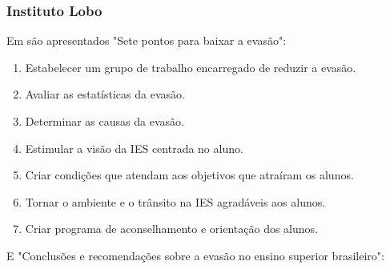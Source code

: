 \documentclass{report}
\begin{document}
\subsubsection{Instituto Lobo}

Em \cite{evasao_panorama2} são apresentados "Sete pontos para baixar a evasão":

\begin{enumerate}

\item Estabelecer um grupo de trabalho encarregado de reduzir a evasão.

\item Avaliar as estatísticas da evasão.

\item Determinar as causas da evasão.

\item Estimular a visão da IES centrada no aluno.

\item Criar condições que atendam aos objetivos que atraíram os alunos.

\item Tornar o ambiente e o trânsito na IES agradáveis aos alunos.

\item Criar programa de aconselhamento e orientação dos alunos.

\end{enumerate}

E "Conclusões e recomendações sobre a evasão no ensino superior brasileiro":
\end{document}
